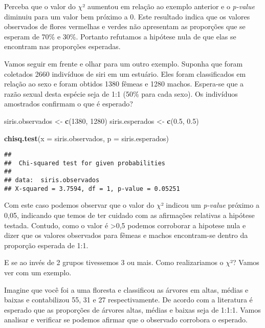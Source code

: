 \documentclass[14pt,titlepage, oneside, openany, a4paper]{book}
\newenvironment{Shaded}{\begin{snugshade}}{\end{snugshade}}
\newcommand{\DataTypeTok}[1]{\textcolor[rgb]{0.13,0.29,0.53}{#1}}
\newcommand{\DecValTok}[1]{\textcolor[rgb]{0.00,0.00,0.81}{#1}}
\newcommand{\FloatTok}[1]{\textcolor[rgb]{0.00,0.00,0.81}{#1}}
\newcommand{\KeywordTok}[1]{\textcolor[rgb]{0.13,0.29,0.53}{\textbf{#1}}}
\newcommand{\NormalTok}[1]{#1}
\newcommand{\StringTok}[1]{\textcolor[rgb]{0.31,0.60,0.02}{#1}}
\begin{document}
Perceba que o valor do \(\chi\)² aumentou em relação ao exemplo anterior e o \emph{p-value} diminuiu para um valor bem próximo a 0. Este resultado indica que os valores observados de flores vermelhas e verdes não apresentam as proporções que se esperam de 70\% e 30\%. Portanto refutamos a hipótese nula de que elas se encontram nas proporções esperadas.

Vamos seguir em frente e olhar para um outro exemplo. Suponha que foram coletados 2660 indivíduos de siri em um estuário. Eles foram classificados em relação ao sexo e foram obtidos 1380 fêmeas e 1280 machos. Espera-se que a razão sexual desta espécie seja de 1:1 (50\% para cada sexo). Os indivíduos amostrados confirmam o que é esperado?

\begin{Shaded}
\begin{Highlighting}[]
\NormalTok{siris.observados <-}\StringTok{ }\KeywordTok{c}\NormalTok{(}\DecValTok{1380}\NormalTok{, }\DecValTok{1280}\NormalTok{)}
\NormalTok{siris.esperados <-}\StringTok{ }\KeywordTok{c}\NormalTok{(}\FloatTok{0.5}\NormalTok{, }\FloatTok{0.5}\NormalTok{)}

\KeywordTok{chisq.test}\NormalTok{(}\DataTypeTok{x =}\NormalTok{ siris.observados, }\DataTypeTok{p =}\NormalTok{ siris.esperados)}
\end{Highlighting}
\end{Shaded}

\begin{verbatim}
## 
##  Chi-squared test for given probabilities
## 
## data:  siris.observados
## X-squared = 3.7594, df = 1, p-value = 0.05251
\end{verbatim}

Com este caso podemos observar que o valor do \(\chi\)² indicou um \emph{p-value} próximo a 0,05, indicando que temos de ter cuidado com as afirmações relativas a hipótese testada. Contudo, como o valor é \textgreater{}0,5 podemos corroborar a hipotese nula e dizer que os valores observados para fêmeas e machos encontram-se dentro da proporção esperada de 1:1.

E se ao invés de 2 grupos tivessemos 3 ou mais. Como realizariamos o \(\chi\)²? Vamos ver com um exemplo.

Imagine que você foi a uma floresta e classificou as árvores em altas, médias e baixas e contabilizou 55, 31 e 27 respectivamente. De acordo com a literatura é esperado que as proporções de árvores altas, médias e baixas seja de 1:1:1. Vamos analisar e verificar se podemos afirmar que o observado corrobora o esperado.
\end{document}
